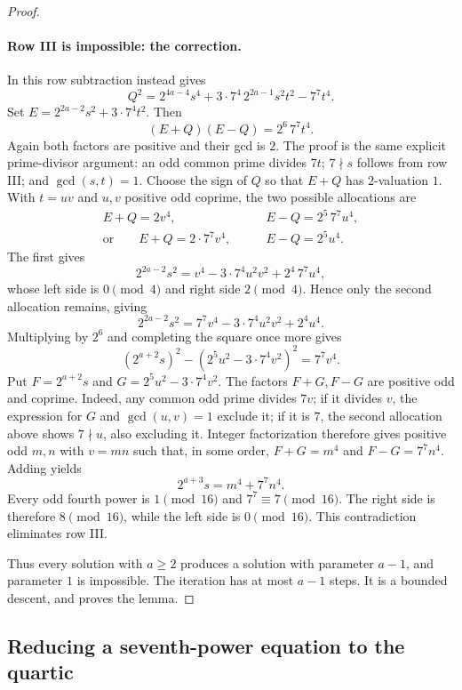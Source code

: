 \begin{proof}
\paragraph{Row III is impossible: the correction.}
In this row subtraction instead gives
\[
 Q^2=2^{4a-4}s^4+3\cdot7^4\,2^{2a-1}s^2t^2-7^7t^4.
\]
Set $E=2^{2a-2}s^2+3\cdot7^4t^2$.  Then
\begin{equation}\label{eq:seven-correction-product}
 (E+Q)(E-Q)=2^6\,7^7t^4.
\end{equation}
Again both factors are positive and their gcd is $2$.  The proof is the
same explicit prime-divisor argument: an odd common prime divides $7t$;
$7\nmid s$ follows from row III; and $\gcd(s,t)=1$.
Choose the sign of $Q$ so that $E+Q$ has $2$-valuation $1$.  With $t=uv$ and
$u,v$ positive odd coprime, the two possible allocations are
\begin{align*}
 E+Q=2v^4,&\qquad E-Q=2^5\,7^7u^4,\\
 \text{or}\qquad E+Q=2\cdot7^7v^4,&\qquad E-Q=2^5u^4.
\end{align*}
The first gives
\[
 2^{2a-2}s^2=v^4-3\cdot7^4u^2v^2+2^4\,7^7u^4,
\]
whose left side is $0\pmod4$ and right side $2\pmod4$.  Hence only the
second allocation remains, giving
\[
 2^{2a-2}s^2=7^7v^4-3\cdot7^4u^2v^2+2^4u^4.
\]
Multiplying by $2^6$ and completing the square once more gives
\begin{equation}\label{eq:seven-final-correction}
 (2^{a+2}s)^2-(2^5u^2-3\cdot7^4v^2)^2=7^7v^4.
\end{equation}
Put $F=2^{a+2}s$ and $G=2^5u^2-3\cdot7^4v^2$.  The factors $F+G,F-G$
are positive odd and coprime.  Indeed, any common odd prime divides $7v$;
if it divides $v$, the expression for $G$ and $\gcd(u,v)=1$ exclude it;
if it is $7$, the second allocation above shows $7\nmid u$, also excluding
it.  Integer factorization therefore gives positive odd $m,n$ with $v=mn$
such that, in some order, $F+G=m^4$ and $F-G=7^7n^4$.  Adding yields
\[
 2^{a+3}s=m^4+7^7n^4.
\]
Every odd fourth power is $1\pmod{16}$ and $7^7\equiv7\pmod{16}$.
The right side is therefore $8\pmod{16}$, while the left side is
$0\pmod{16}$.  This contradiction eliminates row III.

Thus every solution with $a\geq2$ produces a solution with parameter $a-1$,
and parameter $1$ is impossible.  The iteration has at most $a-1$ steps.
It is a bounded descent, and proves the lemma.
\end{proof}

\subsection{Reducing a seventh-power equation to the quartic}

